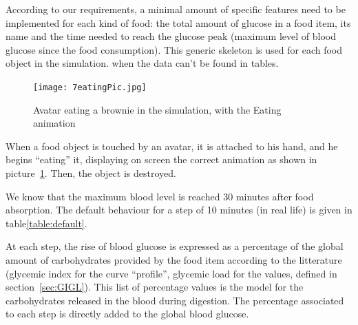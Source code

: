 According to our requirements, a minimal amount of specific features need to be implemented for each kind of food: the total amount of glucose in a food item, its name and the time needed to reach the glucose peak (maximum level of blood glucose since the food consumption). This generic skeleton is used for each food object in the simulation. 
when the data can't be found in tables. \\



\begin{figure}[h]
  \caption{Avatar eating a brownie in the simulation, with the Eating animation}
  \centering
  \texttt{[image: 7eatingPic.jpg]}
  \label{fig:7eatingPic}
\end{figure}

When a food object is touched by an avatar, it is attached to his hand, and he begins ``eating'' it, displaying on screen the correct animation as shown in picture~\ref{fig:7eatingPic}. Then, the object is destroyed.

\iffalse
We know that the maximum blood level is reached 30 minutes after food absorption.
The default behaviour for a step of 10 minutes (in real life) is given in table\ref{table:default}. %

At each step, the rise of blood glucose is expressed as a percentage of the global amount of carbohydrates provided by the food item according to the litterature (glycemic index for the curve ``profile'', glycemic load for the values, defined in section~\ref{sec:GIGL}). This list of percentage values is the model for the carbohydrates released in the blood during digestion. 
The percentage associated to each step is directly added to the global blood glucose. 

